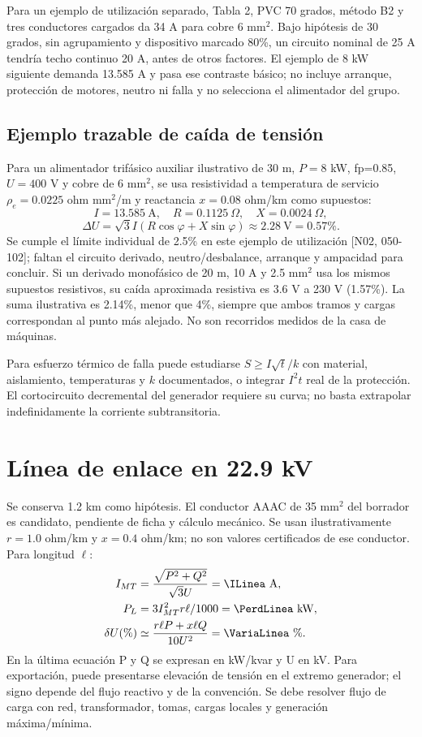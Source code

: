 Para un ejemplo de utilización separado, Tabla 2, PVC 70 grados, método B2 y tres conductores cargados da 34 A para cobre 6 mm$^2$. Bajo hipótesis de 30 grados, sin agrupamiento y dispositivo marcado 80\%, un circuito nominal de 25 A tendría techo continuo 20 A, antes de otros factores. El ejemplo de 8 kW siguiente demanda 13.585 A y pasa ese contraste básico; no incluye arranque, protección de motores, neutro ni falla y no selecciona el alimentador del grupo.

\subsection{Ejemplo trazable de caída de tensión}
Para un alimentador trifásico auxiliar ilustrativo de 30 m, $P=8$ kW, fp=0.85, $U=400$ V y cobre de 6 mm$^2$, se usa resistividad a temperatura de servicio $\rho_e=0.0225$ ohm mm$^2$/m y reactancia $x=0.08$ ohm/km como supuestos:
\[
I=13.585\ \mathrm{A},\quad R=0.1125\ \Omega,\quad X=0.0024\ \Omega,
\]
\[
\Delta U=\sqrt3 I(R\cos\varphi+X\sin\varphi)\approx2.28\ \mathrm{V}=0.57\%.
\]
Se cumple el límite individual de 2.5\% en este ejemplo de utilización [N02, 050-102]; faltan el circuito derivado, neutro/desbalance, arranque y ampacidad para concluir. Si un derivado monofásico de 20 m, 10 A y 2.5 mm$^2$ usa los mismos supuestos resistivos, su caída aproximada resistiva es 3.6 V a 230 V (1.57\%). La suma ilustrativa es 2.14\%, menor que 4\%, siempre que ambos tramos y cargas correspondan al punto más alejado. No son recorridos medidos de la casa de máquinas.

Para esfuerzo térmico de falla puede estudiarse $S\ge I\sqrt{t}/k$ con material, aislamiento, temperaturas y $k$ documentados, o integrar $I^2t$ real de la protección. El cortocircuito decremental del generador requiere su curva; no basta extrapolar indefinidamente la corriente subtransitoria.

\section{Línea de enlace en 22.9 kV}
Se conserva 1.2 km como hipótesis. El conductor AAAC de 35 mm$^2$ del borrador es candidato, pendiente de ficha y cálculo mecánico. Se usan ilustrativamente $r=1.0$ ohm/km y $x=0.4$ ohm/km; no son valores certificados de ese conductor. Para longitud $\ell$:
\begin{align}
I_{MT}&=\frac{\sqrt{P^2+Q^2}}{\sqrt3 U}=\ILinea\ \mathrm{A},\\
P_L&=3I_{MT}^2r\ell/1000=\PerdLinea\ \mathrm{kW},\\
\delta U(\%)&\simeq\frac{r\ell P+x\ell Q}{10U^2}=\VariaLinea\ \%.
\end{align}
En la última ecuación P y Q se expresan en kW/kvar y U en kV. Para exportación, puede presentarse elevación de tensión en el extremo generador; el signo depende del flujo reactivo y de la convención. Se debe resolver flujo de carga con red, transformador, tomas, cargas locales y generación máxima/mínima.

